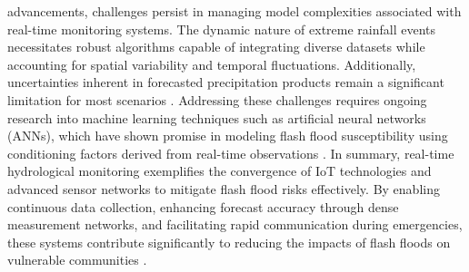 advancements, challenges persist in managing model complexities associated with real-time monitoring systems. The dynamic nature of extreme rainfall events necessitates robust algorithms capable of integrating diverse datasets while accounting for spatial variability and temporal fluctuations. Additionally, uncertainties inherent in forecasted precipitation products remain a significant limitation for most scenarios \citep{Zanchetta2020}. Addressing these challenges requires ongoing research into machine learning techniques such as artificial neural networks (ANNs), which have shown promise in modeling flash flood susceptibility using conditioning factors derived from real-time observations \citep{Ngo2018}. In summary, real-time hydrological monitoring exemplifies the convergence of IoT technologies and advanced sensor networks to mitigate flash flood risks effectively. By enabling continuous data collection, enhancing forecast accuracy through dense measurement networks, and facilitating rapid communication during emergencies, these systems contribute significantly to reducing the impacts of flash floods on vulnerable communities \citep{Msigwa2024}\citep{Zanchetta2020}\citep{Ngo2018}.

